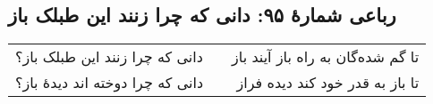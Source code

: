 \begin{center}
\section*{رباعی شمارهٔ ۹۵: دانی که چرا زنند این طبلک باز}
\label{sec:095}
\begin{longtable}{l p{0.5cm} r}
دانی که چرا زنند این طبلک باز؟
&&
تا گم شده‌گان  به راه باز آیند باز 
\\
دانی که چرا دوخته اند دیدهٔ باز؟
&&
تا باز به قدر خود کند دیده فراز
\\
\end{longtable}
\end{center}
